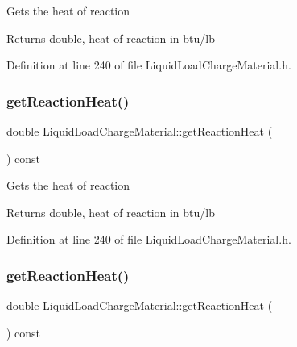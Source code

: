 Gets the heat of reaction \begin{DoxyReturn}{Returns}
double, heat of reaction in btu/lb 
\end{DoxyReturn}


Definition at line 240 of file Liquid\+Load\+Charge\+Material.\+h.

\mbox{\label{class_liquid_load_charge_material_a2f0c26e789e98efd1e8fd0c8741ddd92}} 
\subsubsection{\texorpdfstring{get\+Reaction\+Heat()}{getReactionHeat()}\hspace{0.1cm}{\footnotesize\ttfamily [2/3]}}
{\footnotesize\ttfamily double Liquid\+Load\+Charge\+Material\+::get\+Reaction\+Heat (\begin{DoxyParamCaption}{ }\end{DoxyParamCaption}) const\hspace{0.3cm}{\ttfamily [inline]}}

Gets the heat of reaction \begin{DoxyReturn}{Returns}
double, heat of reaction in btu/lb 
\end{DoxyReturn}


Definition at line 240 of file Liquid\+Load\+Charge\+Material.\+h.

\mbox{\label{class_liquid_load_charge_material_a2f0c26e789e98efd1e8fd0c8741ddd92}} 
\subsubsection{\texorpdfstring{get\+Reaction\+Heat()}{getReactionHeat()}\hspace{0.1cm}{\footnotesize\ttfamily [3/3]}}
{\footnotesize\ttfamily double Liquid\+Load\+Charge\+Material\+::get\+Reaction\+Heat (\begin{DoxyParamCaption}{ }\end{DoxyParamCaption}) const\hspace{0.3cm}{\ttfamily [inline]}}

